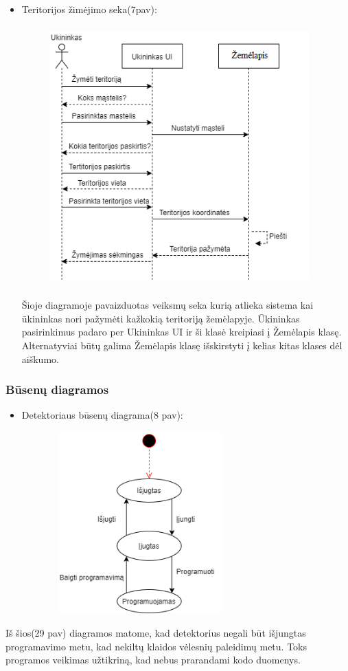 \documentclass[oneside]{VUMIFPSkursinis}
\begin{document}
\begin{itemize}
\pagebreak

\item Teritorijos žimėjimo seka(7pav):
	\begin{figure}[H]
		\centering	
	\includegraphics[width=10cm,height=10cm,keepaspectratio]{ŽymėtiTeritorijas.png}
	\caption{}
	\label{fig:ŽymėtiTeritorijas}
\end{figure}

Šioje diagramoje pavaizduotas veiksmų seka kurią atlieka sistema kai ūkininkas nori pažymėti kažkokią teritoriją žemėlapyje. Ūkininkas pasirinkimus padaro per Ukininkas UI ir ši klasė kreipiasi į Žemėlapis klasę. Alternatyviai būtų galima Žemėlapis klasę išskirstyti į kelias kitas klases dėl aiškumo.

\end{itemize}
\subsubsection{Būsenų diagramos}
\begin{itemize}
\item Detektoriaus būsenų diagrama(8 pav):

		\begin{figure}[H]
		\centering	
	\includegraphics[width=7cm,height=7cm,keepaspectratio]{BusenuDetektorius.png}
	\caption{}
	\label{fig:BusenuDetektorius}
\end{figure}

\end{itemize}
Iš šios(29 pav) diagramos  matome, kad detektorius negali būt išjungtas programavimo metu, kad nekiltų klaidos vėlesnių paleidimų metu. Toks programos veikimas užtikriną, kad nebus prarandami kodo duomenys. 
\end{document}
